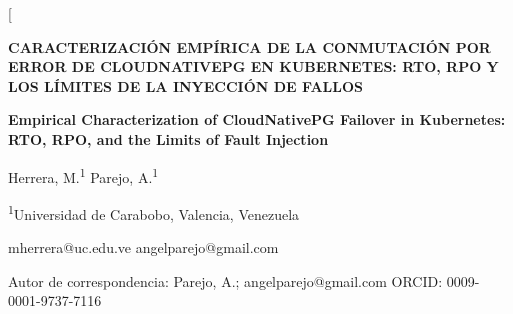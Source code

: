 \documentclass[12pt,twocolumn,letterpaper]{article}
\begin{document}
\twocolumn[{%
\begin{@twocolumnfalse}
\begin{center}
{\fontsize{14}{17}\selectfont\bfseries
CARACTERIZACIÓN EMPÍRICA DE LA CONMUTACIÓN POR ERROR DE CLOUDNATIVEPG EN KUBERNETES: RTO, RPO Y LOS LÍMITES DE LA INYECCIÓN DE FALLOS\par}

\vspace{1em}
{\fontsize{12}{15}\selectfont\bfseries
Empirical Characterization of CloudNativePG Failover in Kubernetes: RTO, RPO, and the Limits of Fault Injection\par}

\vspace{1.2em}
{\normalsize Herrera, M.\textsuperscript{1} \quad Parejo, A.\textsuperscript{1}\par}
\vspace{0.3em}
{\small \textsuperscript{1}Universidad de Carabobo, Valencia, Venezuela\par}
{\small mherrera@uc.edu.ve \quad angelparejo@gmail.com\par}
{\small *Autor de correspondencia: Parejo, A.; angelparejo@gmail.com \quad ORCID: 0009-0001-9737-7116\par}
\end{center}


\end{@twocolumnfalse}}
\end{document}
